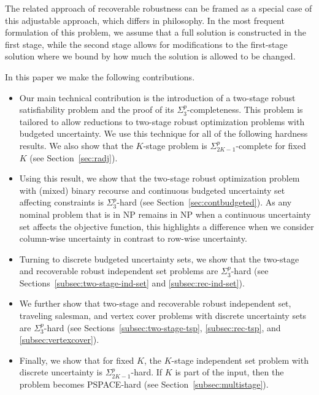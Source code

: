 \documentclass[a4paper,abstracton]{scrartcl}
\begin{document}
The related approach of recoverable robustness \cite{liebchen2009concept} can be framed as a special case of this adjustable approach, which differs in philosophy. In the most frequent formulation of this problem, we assume that a full solution is constructed in the first stage, while the second stage allows for modifications to the first-stage solution where we bound by how much the solution is allowed to be changed.

In this paper we make the following contributions.
\begin{itemize}
\item Our main technical contribution is the introduction of a two-stage robust satisfiability problem 
and the proof of its $\Sigma^p_3$-completeness. 
This problem is tailored to allow reductions to two-stage robust optimization problems with budgeted uncertainty.
We use this technique for all of the following hardness results.
We also show that the $K$-stage problem is $\Sigma_{2K-1}^p$-complete for fixed $K$ (see Section~\ref{sec:radj}).

\item Using this result, we show that the two-stage robust optimization problem with (mixed) binary recourse and continuous budgeted uncertainty set affecting constraints is $\Sigma_3^p$-hard (see Section~\ref{sec:contbudgeted}). As any nominal problem that is in NP remains in NP when a continuous uncertainty set affects the objective function, this highlights a difference when we consider column-wise uncertainty in contrast to row-wise uncertainty.

\item Turning to discrete budgeted uncertainty sets, we show that the two-stage and recoverable robust independent set problems are $\Sigma_3^p$-hard (see Sections~\ref{subsec:two-stage-ind-set} and \ref{subsec:rec-ind-set}).

\item We further show that two-stage and recoverable robust independent set, traveling salesman, and vertex cover problems with discrete uncertainty sets are $\Sigma_3^p$-hard (see Sections~\ref{subsec:two-stage-tsp}, \ref{subsec:rec-tsp}, and \ref{subsec:vertexcover}).

\item Finally, we show that for fixed $K$, the $K$-stage independent set problem with discrete uncertainty is $\Sigma_{2K-1}^p$-hard. If $K$ is part of the input, then the problem becomes PSPACE-hard (see Section~\ref{subsec:multistage}).
\end{itemize}
\end{document}
